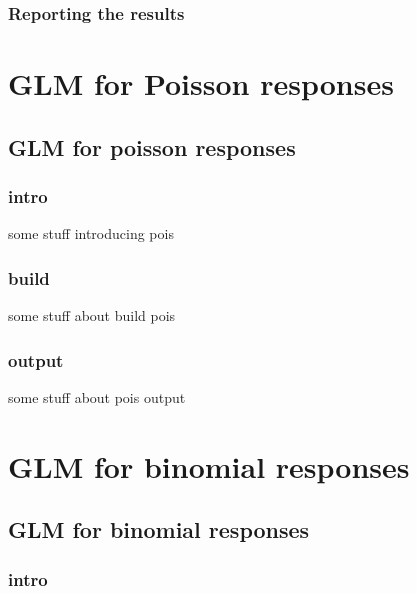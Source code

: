 \documentclass[
]{book}
\begin{document}
\hypertarget{reporting-the-results-3}{%
\section{Reporting the results}\label{reporting-the-results-3}}

\hypertarget{part-glm-for-poisson-responses}{%
\part{GLM for Poisson responses}\label{part-glm-for-poisson-responses}}

\hypertarget{pois}{%
\chapter{GLM for poisson responses}\label{pois}}

\hypertarget{pois-intro}{%
\section{intro}\label{pois-intro}}

some stuff introducing pois

\hypertarget{pois-build}{%
\section{build}\label{pois-build}}

some stuff about build pois

\hypertarget{pois-output}{%
\section{output}\label{pois-output}}

some stuff about pois output

\hypertarget{part-glm-for-binomial-responses}{%
\part{GLM for binomial responses}\label{part-glm-for-binomial-responses}}

\hypertarget{bino}{%
\chapter{GLM for binomial responses}\label{bino}}

\hypertarget{bino-intro}{%
\section{intro}\label{bino-intro}}
\end{document}
